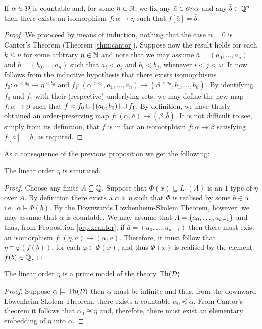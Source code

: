 \begin{prp}\label{prp:xcantor}
	If $\alpha\in\mathcal{D}$ is countable and, for some $n\in\mathbb{N}$, we fix any $\bar{a}\in\partial^{}{n}\alpha$ and any $\bar{b}\in\mathbb{Q}^n$ then there exists an isomorphism $f\colon\alpha\to\eta$ such that $f[\bar{a}]=\bar{b}$.
\end{prp}
\begin{proof}
	We prooceed by means of induction, nothing that the case $n=0$ is Cantor's Theorem (Theorem \ref{thm:cantor}).  Suppose now the result holds for each $k\leq n$ for some arbtrary $n\in\mathbb{N}$ and note that we may assume $\bar{a}=(a_0,\dotsc,a_n)$ and $\bar{b}=(b_0,\dotsc,a_n)$ such that $a_i<a_j$ and $b_i<b_j$, whenever $i<j<\omega$.  It now follows from the inductive hypothesis that there exists isomoprhisms $f_0\colon\alpha^{<a_0}\to\eta^{<b_0}$ and $f_1\colon(\alpha^{>a_0},a_1,\dotsc,a_n)\to(\beta^{>a_0},b_1,\dotsc,b_n)$.  By identifying $f_0$ and $f_1$ with their (respective) underlying sets, we may define the new map $f\colon\alpha\to\beta$ such that $f=f_0\cup\left\lbrace (a_0,b_0)\right\rbrace\cup f_1$.  By definition, we have thusly obtained an order-preserving map $f\colon(\alpha,\bar{a})\to(\beta,\bar{b})$.  It is not difficult to see, simply from its definition, that $f$ is in fact an isomorphism $f\colon\alpha\to\beta$ satisfying $f[\bar{a}]=\bar{b}$, as required.
\end{proof}

As a consequence of the previous proposition we get the following:
\begin{prp}
	The linear order $\eta$ is saturated.
\end{prp}
\begin{proof}
	Choose any finite $A\subseteq\mathbb{Q}$.  Suppose that $\Phi(x)\subseteq L_1(A)$ is an $1$-type of $\eta$ over $A$.  By definition there exists a $\alpha\succcurlyeq\eta$ such that $\Phi$ is realised by some $b\in\alpha$ i.e.\ $\alpha\models\Phi(b)$.  By the Downwards L\"owhenheim-Skolem Theorem, however, we may assume that $\alpha$ is countable.  We may assume that $A=\left\lbrace a_0,\dotsc,a_{k-1}\right\rbrace$ and thus, from Proposition \ref{prp:xcantor}, if $\bar{a}=(a_0,\dotsc,a_{k-1})$ then there must exist an isomorphism $f\colon(\eta,\bar{a})\to(\alpha,\bar{a})$.  Therefore, it must follow that $\eta\models\varphi(f(b))$, for each $\varphi\in\Phi(x)$, and thus $\Phi(x)$ is realised by the element $f(b)\in\mathbb{Q}$.
\end{proof}


\begin{thm}
	The linear order $\eta$ is a prime model of the theory $\operatorname{Th}(\mathcal{D})$.
\end{thm}
\begin{proof}
	Suppose $\alpha\models\operatorname{Th}(\mathcal{D})$ then $\alpha$ must be infinite and thus, from the downward L\"owenheim-Skolem Theorem, there exists a countable $\alpha_0\preccurlyeq\alpha$.  From Cantor's theorem it follows that $\alpha_0\cong\eta$ and, therefore, there must exist an elementary embedding of $\eta$ into $\alpha$.
\end{proof}

